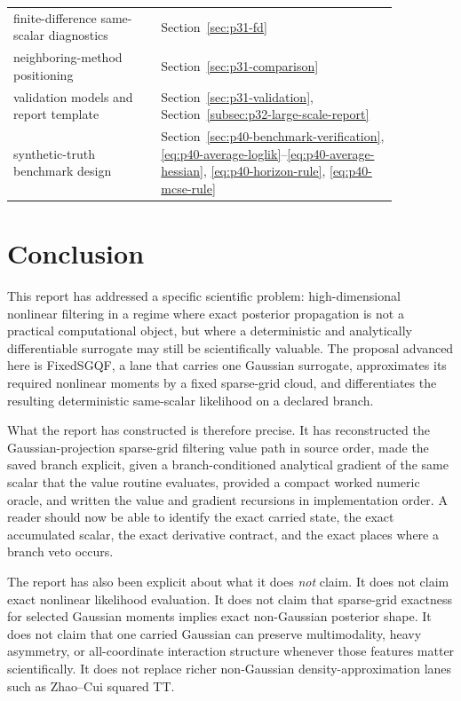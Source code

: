 \documentclass[11pt]{article}
\numberwithin{equation}{section}
\begin{document}
\begin{center}
\begin{tabular}{p{0.33\linewidth}p{0.53\linewidth}}
finite-difference same-scalar diagnostics & Section~\ref{sec:p31-fd} \\
neighboring-method positioning & Section~\ref{sec:p31-comparison} \\
validation models and report template & Section~\ref{sec:p31-validation}, Section~\ref{subsec:p32-large-scale-report} \\
synthetic-truth benchmark design & Section~\ref{sec:p40-benchmark-verification}, \eqref{eq:p40-average-loglik}--\eqref{eq:p40-average-hessian}, \eqref{eq:p40-horizon-rule}, \eqref{eq:p40-mcse-rule} \\
\bottomrule
\end{tabular}
\end{center}

\section{Conclusion}
\label{sec:p31-conclusion}

This report has addressed a specific scientific problem: high-dimensional
nonlinear filtering in a regime where exact posterior propagation is not a
practical computational object, but where a deterministic and analytically
differentiable surrogate may still be scientifically valuable.  The proposal
advanced here is FixedSGQF, a lane that carries one Gaussian surrogate,
approximates its required nonlinear moments by a fixed sparse-grid cloud, and
differentiates the resulting deterministic same-scalar likelihood on a declared
branch.

What the report has constructed is therefore precise.  It has reconstructed the
Gaussian-projection sparse-grid filtering value path in source order, made the
saved branch explicit, given a branch-conditioned analytical gradient of the
same scalar that the value routine evaluates, provided a compact worked numeric
oracle, and written the value and gradient recursions in implementation order.
A reader should now be able to identify the exact carried state, the exact
accumulated scalar, the exact derivative contract, and the exact places where a
branch veto occurs.

The report has also been explicit about what it does \emph{not} claim.  It does
not claim exact nonlinear likelihood evaluation.  It does not claim that
sparse-grid exactness for selected Gaussian moments implies exact non-Gaussian
posterior shape.  It does not claim that one carried Gaussian can preserve
multimodality, heavy asymmetry, or all-coordinate interaction structure whenever
those features matter scientifically.  It does not replace richer non-Gaussian
density-approximation lanes such as Zhao--Cui squared TT.
\end{document}
